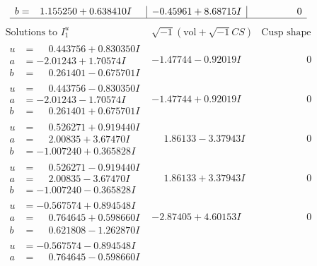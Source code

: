 \documentclass[1p]{elsarticle_modified}
\theoremstyle{definition}
\newcommand{\I}{\sqrt{-1}}
\begin{document}
$$\begin{array}{c|c|c}
\begin{aligned}
b &= \phantom{-}1.155250 + 0.638410 I\end{aligned}
 & -0.45961 + 8.68715 I & \phantom{-0.000000 } 0\\
 \hline 
 \end{array}$$\newpage$$\begin{array}{c|c|c}  
\text{Solutions to }I^u_{1}& \I (\text{vol} + \sqrt{-1}CS) & \text{Cusp shape}\\
 \hline 
\begin{aligned}
u &= \phantom{-}0.443756 + 0.830350 I \\
a &= -2.01243 + 1.70574 I \\
b &= \phantom{-}0.261401 - 0.675701 I\end{aligned}
 & -1.47744 - 0.92019 I & \phantom{-0.000000 } 0 \\ \hline\begin{aligned}
u &= \phantom{-}0.443756 - 0.830350 I \\
a &= -2.01243 - 1.70574 I \\
b &= \phantom{-}0.261401 + 0.675701 I\end{aligned}
 & -1.47744 + 0.92019 I & \phantom{-0.000000 } 0 \\ \hline\begin{aligned}
u &= \phantom{-}0.526271 + 0.919440 I \\
a &= \phantom{-}2.00835 + 3.67470 I \\
b &= -1.007240 + 0.365828 I\end{aligned}
 & \phantom{-}1.86133 - 3.37943 I & \phantom{-0.000000 } 0 \\ \hline\begin{aligned}
u &= \phantom{-}0.526271 - 0.919440 I \\
a &= \phantom{-}2.00835 - 3.67470 I \\
b &= -1.007240 - 0.365828 I\end{aligned}
 & \phantom{-}1.86133 + 3.37943 I & \phantom{-0.000000 } 0 \\ \hline\begin{aligned}
u &= -0.567574 + 0.894548 I \\
a &= \phantom{-}0.764645 + 0.598660 I \\
b &= \phantom{-}0.621808 - 1.262870 I\end{aligned}
 & -2.87405 + 4.60153 I & \phantom{-0.000000 } 0 \\ \hline\begin{aligned}
u &= -0.567574 - 0.894548 I \\
a &= \phantom{-}0.764645 - 0.598660 I \\

\end{aligned}
\end{array}$$
\end{document}
